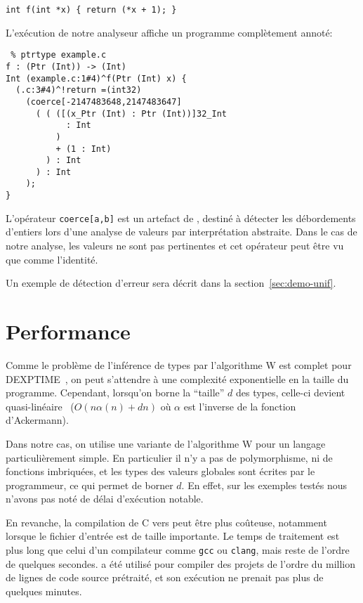 \begin{verbatim}
int f(int *x) { return (*x + 1); }
\end{verbatim}

L'exécution de notre analyseur affiche un programme complètement annoté:

\begin{verbatim}
 % ptrtype example.c
f : (Ptr (Int)) -> (Int)
Int (example.c:1#4)^f(Ptr (Int) x) {
  (.c:3#4)^!return =(int32)
    (coerce[-2147483648,2147483647]
      ( ( ([(x_Ptr (Int) : Ptr (Int))]32_Int
            : Int
          )
          + (1 : Int)
        ) : Int
      ) : Int
    );
}
\end{verbatim}


L'opérateur \texttt{coerce[a,b]} est un artefact de \newspeak, destiné à
détecter les débordements d'entiers lors d'une analyse de valeurs par
interprétation abstraite. Dans le cas de notre analyse, les valeurs ne sont pas
pertinentes et cet opérateur peut être vu que comme l'identité.

Un exemple de détection d'erreur sera décrit dans la section~\ref{sec:demo-unif}.

\section{Performance}


Comme le problème de l'inférence de types par l'algorithme W est complet pour
DEXPTIME~\cite{mairson}, on peut s'attendre à une complexité exponentielle en la
taille du programme. Cependant, lorsqu'on borne la \enquote{taille} $d$ des
types, celle-ci devient quasi-linéaire~\cite{rta03} ($O(n α(n) + dn)$ où $α$ est
l'inverse de la fonction d'Ackermann).


Dans notre cas, on utilise une variante de l'algorithme W pour un langage
particulièrement simple. En particulier il n'y a pas de polymorphisme, ni de
fonctions imbriquées, et les types des valeurs globales sont écrites par le
programmeur, ce qui permet de borner $d$. En effet, sur les exemples testés nous
n'avons pas noté de délai d'exécution notable.

En revanche, la compilation de C vers \newspeak peut être plus coûteuse,
notamment lorsque le fichier d'entrée est de taille importante. Le temps de
traitement est plus long que celui d'un compilateur comme \texttt{gcc} ou
\texttt{clang}, mais reste de l'ordre de quelques secondes. \ctonewspeak a été
utilisé pour compiler des projets de l'ordre du million de lignes de code source
prétraité, et son exécution ne prenait pas plus de quelques minutes.

